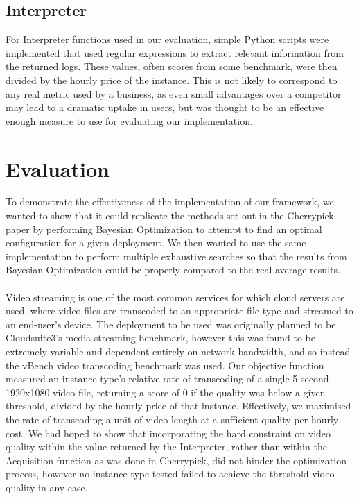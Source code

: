 \documentclass{article}
\begin{document}
\subsection{Interpreter}
For Interpreter functions used in our evaluation, simple Python scripts were implemented that used regular expressions to extract relevant information from the returned logs. These values, often scores from some benchmark, were then divided by the hourly price of the instance.
This is not likely to correspond to any real metric used by a business, as even small advantages over a competitor may lead to a dramatic uptake in users, but was thought to be an effective enough measure to use for evaluating our implementation.

\section{Evaluation}
To demonstrate the effectiveness of the implementation of our framework, we wanted to show that it could replicate the methods set out in the Cherrypick paper \cite{Alipourfard2017} by performing Bayesian Optimization to attempt to find an optimal configuration for a given deployment. We then wanted to use the same implementation to perform multiple exhaustive searches so that the results from Bayesian Optimization could be properly compared to the real average results.

\paragraph{}
Video streaming is one of the most common services for which cloud servers are used, where video files are transcoded to an appropriate file type and streamed to an end-user's device\cite{JunXin2005, Lottarini2018}.
The deployment to be used was originally planned to be Cloudsuite3's media streaming benchmark\cite{Palit2016}, however this was found to be extremely variable and dependent entirely on network bandwidth, and so instead the vBench video transcoding benchmark was used\cite{Lottarini2018}. Our objective function measured an instance type's relative rate of transcoding of a single 5 second 1920x1080 video file, returning a score of 0 if the quality was below a given threshold, divided by the hourly price of that instance. Effectively, we maximised the rate of transcoding a unit of video length at a sufficient quality per hourly cost. We had hoped to show that incorporating the hard constraint on video quality within the value returned by the Interpreter, rather than within the Acquisition function as was done in Cherrypick, did not hinder the optimization process, however no instance type tested failed to achieve the threshold video quality in any case.
\end{document}
